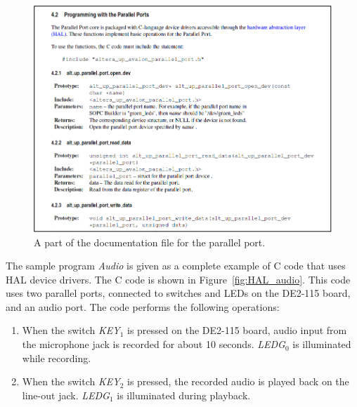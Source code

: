 \documentclass[11pt, twoside, pdftex]{article}
\begin{document}
\clearpage
\begin{figure}[h!]
   \begin{center}
      \includegraphics[scale=0.65]{figures/parallel_port_doc.png}
   \end{center}
   \caption{A part of the documentation file for the parallel port.} 
	\label{fig:parallel_port_doc}
\end{figure}

The sample program {\it Audio} is given as a complete example of C code that uses HAL device drivers.
The C code is shown in Figure~\ref{fig:HAL_audio}. This code uses two parallel ports, connected to
switches and LEDs on the DE2-115 board, and an audio port. The code performs the following operations:
\begin{enumerate}
\item When the switch {\it KEY}$_1$ is pressed on the DE2-115 board, audio input from the microphone jack is recorded for 
about 10 seconds. {\it LEDG}$_0$ is illuminated while recording.
\item When the switch {\it KEY}$_2$ is pressed, the recorded audio is played back on the line-out jack. {\it LEDG}$_1$
is illuminated during playback.
\end{enumerate}
\end{document}
